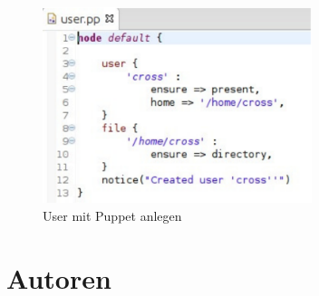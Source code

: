 \documentclass[12pt,a4paper,ngerman]{article}
\begin{document}
\begin{figure}
  \begin{center}
    \includegraphics[width=0.7\textwidth]{images/user.pdf}
  \end{center}
  \caption{User mit Puppet anlegen}
  \label{puppet-user}
\end{figure}

\section*{Autoren}
\end{document}

